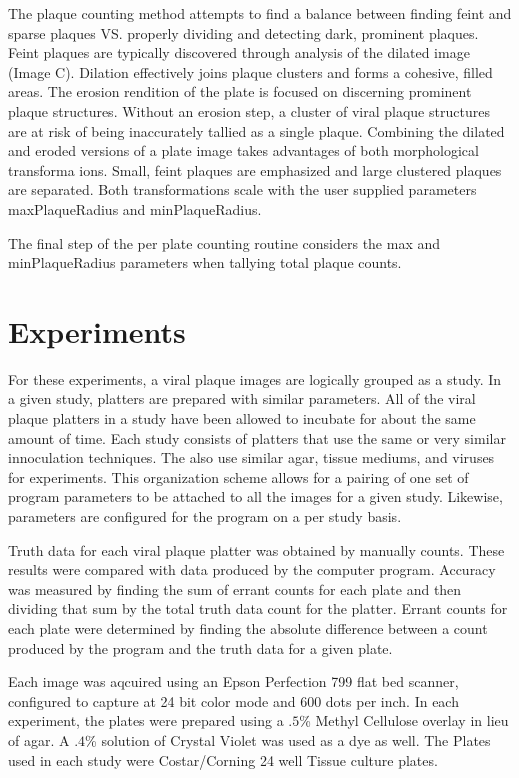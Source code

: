 \documentclass[11pt,final,twocolumn]{IEEEtran}
\begin{document}
The plaque counting method attempts to find a balance between finding feint and sparse plaques VS. properly dividing and detecting dark, prominent plaques. Feint  plaques are typically discovered through analysis of the dilated image (Image C). Dilation effectively joins plaque clusters and forms a cohesive, filled areas. The erosion rendition of the plate is focused on discerning prominent plaque structures.  Without an erosion step, a cluster of viral plaque structures are at risk of being inaccurately tallied as a single plaque. Combining the dilated and eroded versions of a plate image takes advantages of both morphological transforma ions. Small, feint plaques are emphasized and large  clustered plaques are separated. Both transformations scale with the user supplied parameters maxPlaqueRadius and minPlaqueRadius.

The final step of the per plate counting routine considers the max and minPlaqueRadius parameters when tallying total plaque counts. 

\section{Experiments}

For these experiments, a viral plaque images are logically grouped as a study. In a given study, platters are prepared with similar parameters. All of the viral plaque platters in a study have been allowed to incubate for about the same amount of time. Each study consists of platters that use the same or very similar innoculation techniques. The also use similar agar, tissue mediums, and viruses for experiments. This organization scheme allows for a pairing of one set of program parameters to be attached to all the images for a given study. Likewise, parameters are configured for the program on a per study 
basis.

Truth data for each viral plaque platter was obtained by manually counts. These results were compared with data produced by the computer program. Accuracy was measured by finding the sum of errant counts for each plate and then dividing that sum by the total truth data count for the platter. Errant counts for each plate were determined by finding the absolute difference between a count produced by the program and the truth data for a given plate.

Each image was aqcuired using an Epson Perfection 799 flat bed scanner, configured to capture at 24 bit color mode and 600 dots per inch. In each experiment, the plates were prepared using a $.5$\%   Methyl Cellulose overlay in lieu of agar. A $.4$\% solution of Crystal Violet was used as a dye as well. 
The Plates used in each study were Costar/Corning 24 well Tissue culture plates. 
\end{document}
